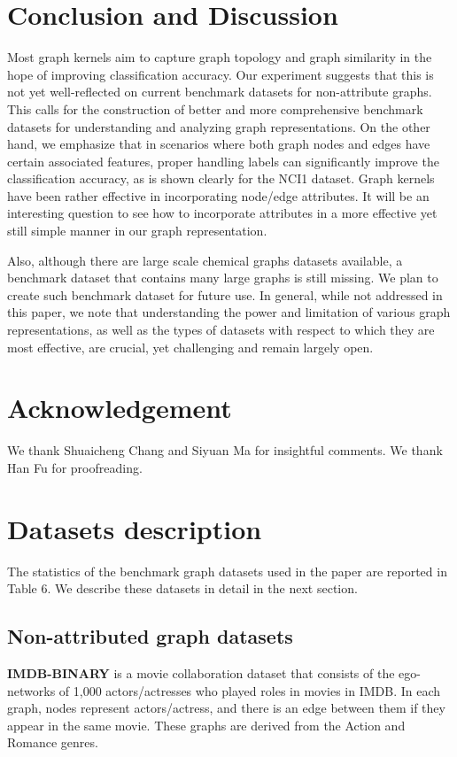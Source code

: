 \documentclass[11pt,onecolumn]{article}
\begin{document}
\section{Conclusion and Discussion}
 
Most graph kernels aim to capture graph topology and graph similarity in the hope of improving classification accuracy. Our experiment suggests that this is not yet well-reflected on current benchmark datasets for non-attribute graphs. This calls for the construction of better and more comprehensive benchmark datasets for understanding and analyzing graph representations. On the other hand, we emphasize that in scenarios where both graph nodes and edges have certain associated features,  proper handling labels can significantly improve the classification accuracy, as is shown clearly for the NCI1 dataset. Graph kernels have been rather effective in incorporating node/edge attributes.  It will be an interesting question to see how to incorporate attributes in a more effective yet still simple manner in our graph representation. 
 
 Also, although there are large scale chemical graphs datasets available\cite{hachmann2011harvard, ruddigkeit2012enumeration}, a benchmark dataset that contains many large graphs is still missing. We plan to create such benchmark dataset for future use. In general, while not addressed in this paper, we note that understanding the power and limitation of various graph representations, as well as the types of datasets with respect to which they are most effective, are crucial, yet challenging and remain largely open. 

\section{Acknowledgement}
We thank Shuaicheng Chang and Siyuan Ma for insightful comments. We thank Han Fu for proofreading. 

\section{Datasets description}
\label{sec: dataset}
The statistics of the benchmark graph datasets used in the paper are reported in Table 6. We describe these datasets in detail in the next section.
\subsection{Non-attributed graph datasets}
\textbf{IMDB-BINARY}  \cite{yanardag2015deep} is a movie collaboration dataset that consists of the ego-networks of 1,000 actors/actresses who played roles in movies in IMDB. In each graph, nodes represent actors/actress, and there is an edge between them if they appear in the same movie. These graphs are derived from
the Action and Romance genres.
\end{document}
